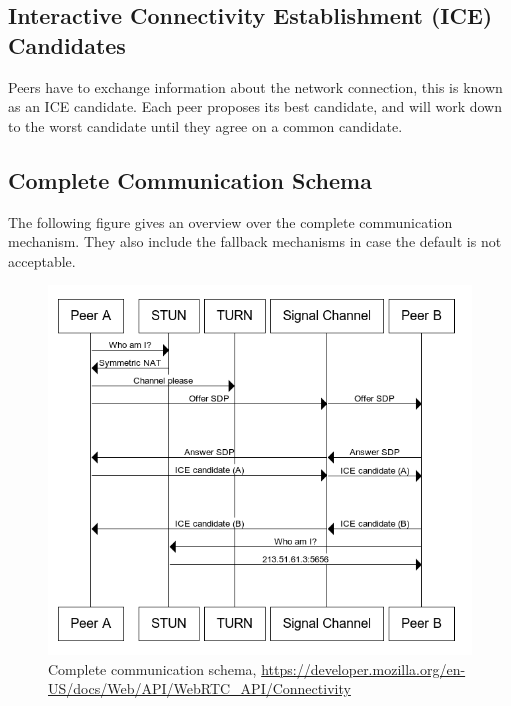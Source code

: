 \subsection{Interactive Connectivity Establishment (ICE) Candidates}
Peers have to exchange information about the network connection, this is known as an ICE candidate. Each peer proposes its best candidate, and will work down to the worst candidate until they agree on a common candidate.

\subsection{Complete Communication Schema}
The following figure gives an overview over the complete communication mechanism. They also include the fallback mechanisms in case the default is not acceptable.

\begin{figure}[H]
	\includegraphics[scale=0.5]{images/webrtc-complete-diagram.png}
	\centering
	\caption{ Complete communication schema, \url{https://developer.mozilla.org/en-US/docs/Web/API/WebRTC_API/Connectivity}}
	\label{fig:WebRTC}
\end{figure}
